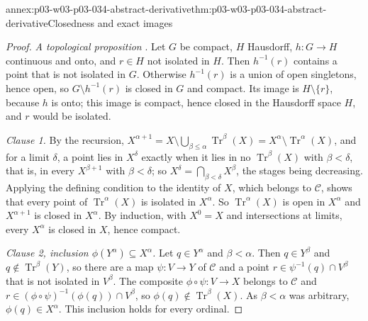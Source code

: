 \begin{annexitem}{annex:p03-w03-p03-034-abstract-derivative}{thm:p03-w03-p03-034-abstract-derivative}{Closedness and exact images}
\begin{proof}
\emph{A topological proposition} \cite[p.~520]{Morley1965}. Let \(G\) be
compact, \(H\) Hausdorff, \(h:G\to H\) continuous and onto, and \(r\in H\)
not isolated in \(H\). Then \(h^{-1}(r)\) contains a point that is not
isolated in \(G\). Otherwise \(h^{-1}(r)\) is a union of open singletons,
hence open, so \(G\setminus h^{-1}(r)\) is closed in \(G\) and compact. Its
image is \(H\setminus\{r\}\), because \(h\) is onto; this image is compact,
hence closed in the Hausdorff space \(H\), and \(r\) would be isolated.

\emph{Clause 1.} By the recursion,
\(X^{\alpha+1}=X\setminus\bigcup_{\beta\leq\alpha}\operatorname{Tr}^\beta(X)
=X^\alpha\setminus\operatorname{Tr}^\alpha(X)\), and for a limit
\(\delta\), a point lies in \(X^\delta\) exactly when it lies in no
\(\operatorname{Tr}^\beta(X)\) with \(\beta<\delta\), that is, in every
\(X^{\beta+1}\) with \(\beta<\delta\); so
\(X^\delta=\bigcap_{\beta<\delta}X^\beta\), the stages being decreasing.
Applying the defining condition to the identity of \(X\), which belongs to
\(\mathcal C\), shows that every point of \(\operatorname{Tr}^\alpha(X)\)
is isolated in \(X^\alpha\). So \(\operatorname{Tr}^\alpha(X)\) is open in
\(X^\alpha\) and \(X^{\alpha+1}\) is closed in \(X^\alpha\). By induction,
with \(X^0=X\) and intersections at limits, every \(X^\alpha\) is closed in
\(X\), hence compact.

\emph{Clause 2, inclusion \(\phi(Y^\alpha)\subseteq X^\alpha\).} Let
\(q\in Y^\alpha\) and \(\beta<\alpha\). Then \(q\in Y^\beta\) and
\(q\notin\operatorname{Tr}^\beta(Y)\), so there are a map
\(\psi:V\to Y\) of \(\mathcal C\) and a point
\(r\in\psi^{-1}(q)\cap V^\beta\) that is not isolated in \(V^\beta\).
The composite \(\phi\circ\psi:V\to X\) belongs to \(\mathcal C\) and
\(r\in(\phi\circ\psi)^{-1}(\phi(q))\cap V^\beta\), so
\(\phi(q)\notin\operatorname{Tr}^\beta(X)\). As \(\beta<\alpha\) was
arbitrary, \(\phi(q)\in X^\alpha\). This inclusion holds for every ordinal.


\end{proof}
\end{annexitem}
